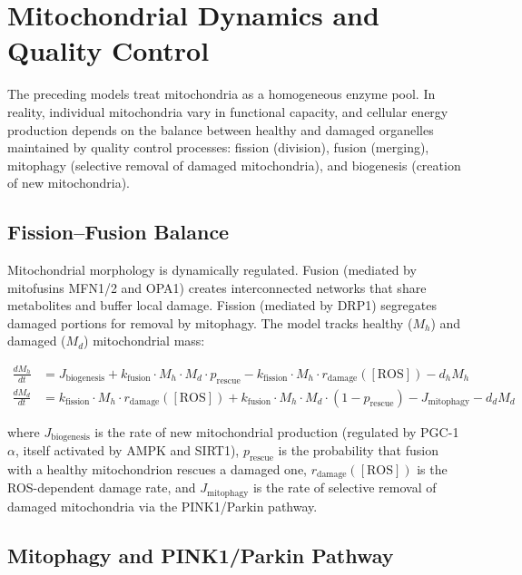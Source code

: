 \section{Mitochondrial Dynamics and Quality Control}
\label{sec:mitochondrial-dynamics}

The preceding models treat mitochondria as a homogeneous enzyme pool. In reality, individual mitochondria vary in functional capacity, and cellular energy production depends on the balance between healthy and damaged organelles maintained by quality control processes: fission (division), fusion (merging), mitophagy (selective removal of damaged mitochondria), and biogenesis (creation of new mitochondria).

\subsection{Fission--Fusion Balance}

Mitochondrial morphology is dynamically regulated. Fusion (mediated by mitofusins MFN1/2 and OPA1) creates interconnected networks that share metabolites and buffer local damage. Fission (mediated by DRP1) segregates damaged portions for removal by mitophagy. The model tracks healthy ($M_h$) and damaged ($M_d$) mitochondrial mass:

\begin{align}
\label{eq:mito-dynamics}
\frac{dM_h}{dt} &= J_{\text{biogenesis}} + k_{\text{fusion}} \cdot M_h \cdot M_d \cdot p_{\text{rescue}} - k_{\text{fission}} \cdot M_h \cdot r_{\text{damage}}([\text{ROS}]) - d_h M_h \\
\frac{dM_d}{dt} &= k_{\text{fission}} \cdot M_h \cdot r_{\text{damage}}([\text{ROS}]) + k_{\text{fusion}} \cdot M_h \cdot M_d \cdot (1 - p_{\text{rescue}}) - J_{\text{mitophagy}} - d_d M_d
\end{align}

where $J_{\text{biogenesis}}$ is the rate of new mitochondrial production (regulated by PGC-1$\alpha$, itself activated by AMPK and SIRT1), $p_{\text{rescue}}$ is the probability that fusion with a healthy mitochondrion rescues a damaged one, $r_{\text{damage}}([\text{ROS}])$ is the ROS-dependent damage rate, and $J_{\text{mitophagy}}$ is the rate of selective removal of damaged mitochondria via the PINK1/Parkin pathway.

\subsection{Mitophagy and PINK1/Parkin Pathway}

